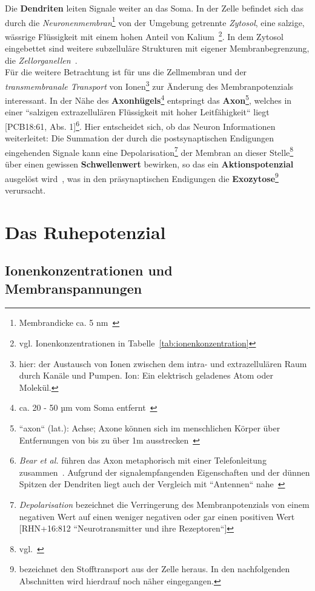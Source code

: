 Die \textbf{Dendriten} leiten Signale weiter an das Soma.
In der Zelle befindet sich das durch die \textit{Neuronenmembran}\footnote{
 Membrandicke ca. 5 nm~\cite[66]{FE19}
} von der Umgebung getrennte \textit{Zytosol}, eine salzige, wässrige Flüssigkeit mit einem hohen Anteil von Kalium~\cite[29]{BCP18}\footnote{
 vgl. Ionenkonzentrationen in Tabelle~\ref{tab:ionenkonzentration}
}.
In dem Zytosol eingebettet sind weitere subzelluläre Strukturen mit eigener Membranbegrenzung, die \textit{Zellorganellen}~\cite[8]{SD07}.\\
Für die weitere Betrachtung ist für uns die Zellmembran und der \textit{transmembranale Transport} von Ionen\footnote{
 hier: der Austausch von Ionen zwischen dem intra- und extrazellulären Raum durch Kanäle und Pumpen. Ion: Ein elektrisch geladenes Atom oder Molekül.
} zur Änderung des Membranpotenzials interessant. In der Nähe des \textbf{Axonhügels}\footnote{
 ca. 20 - 50 µm vom Soma entfernt~\cite[77]{Jon19}
} entspringt das \textbf{Axon}\footnote{
 ``axon`` (lat.): Achse; Axone können sich im menschlichen Körper über Entfernungen von bis zu über 1m ausstrecken~\cite[28]{BCP18}
}, welches in einer ``salzigen extrazellulären Flüssigkeit mit hoher Leitfähigkeit`` liegt [PCB18:61, Abs. 1]\footnote{
  \textit{Bear et al.} führen das Axon metaphorisch mit einer Telefonleitung zusammen~\cite[43]{BCP18}. Aufgrund der signalempfangenden Eigenschaften und der dünnen Spitzen der Dendriten liegt auch der Vergleich mit ``Antennen`` nahe~\cite[28]{BCP18}
}.
Hier entscheidet sich, ob das Neuron Informationen weiterleitet: Die Summation der durch die postsynaptischen Endigungen eingehenden Signale kann eine Depolarisation\footnote{
  \textit{Depolarisation} bezeichnet die Verringerung des Membranpotenzials von einem negativen Wert auf einen weniger negativen oder gar einen positiven Wert {[RHN+16:812 ``Neurotransmitter und ihre Rezeptoren``]}
} der Membran an dieser Stelle\footnote{vgl.~\cite[61]{Eil19}} über einen gewissen \textbf{Schwellenwert} bewirken, so das ein \textbf{Aktionspotenzial} ausgelöst wird~\cite[142 f.]{BCP18}, was in den präsynaptischen Endigungen die \textbf{Exozytose}\footnote{
  bezeichnet den Stofftransport aus der Zelle heraus. In den nachfolgenden Abschnitten wird hierdrauf noch näher eingegangen.
} verursacht.


\section{Das Ruhepotenzial}

\subsection{Ionenkonzentrationen und Membranspannungen}\label{sec-ionenkonzentrationen}

